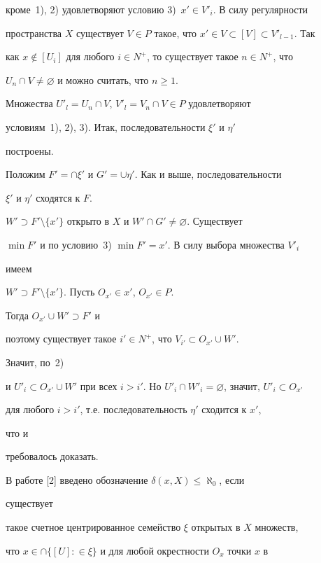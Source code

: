 кроме~1), 2) удовлетворяют условию 3)~$x'\in V'_i$. В силу регулярности  


пространства $X$ существует $V\in P$ такое, что $x'\in 


V\subset[V]\subset V'_{l-1}$. Так 


как $x\notin[U_i]$ для любого $i\in N^+$, то существует такое $n\in 


N^+$, что  


$U_n\cap V\ne\varnothing$ и можно считать, что $n\ge 1$. 


 


Множества $U'_l=U_n\cap V$, $V'_l=V_n\cap V\in P$ удовлетворяют  


условиям~1), 2), 3). Итак, последовательности $\xi'$ и $\eta'$ 


построены.  


Положим $F'=\cap\xi'$ и $G'=\cup\eta'$. Как и выше, последовательности  


$\xi'$ и $\eta'$ сходятся к $F$.\; 


$W'\supset F'\setminus\{x'\}$ открыто в $X$ и $W'\cap 


G'\ne\varnothing$. Существует 


$\min F'$ и по условию~3) $\min F'=x'$. В силу выбора множества $V'_i$ 


имеем  


$W'\supset F'\setminus\{x'\}$. Пусть $O_{x'}\in x'$, $O_{x'}\in P$. 


Тогда $O_{x'}\cup W'\supset F'$ и 


поэтому существует такое $i'\in N^+$, что $V_{i'}\subset O_{x'}\cup W'$. 


Значит, по~2)  


и $U'_i\subset O_{x'}\cup W'$ при всех $i>i'$. Но $U'_i\cap 


W'_i=\varnothing$, значит, $U'_i\subset O_{x'}$ 


для любого $i>i'$, т.е. последовательность $\eta'$ сходится к $x'$, 


что и  


требовалось доказать. 


 


В работе [2] введено обозначение $\delta(x,X)\le\aleph_0$, если 


существует  


такое счетное центрированное семейство $\xi$ открытых в $X$ множеств,  


что $x\in\cap\{[U]:\in\xi\}$ и для любой окрестности $O_x$ точки $x$ в 


